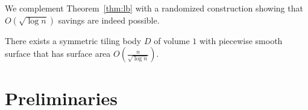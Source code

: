 We complement Theorem~\ref{thm:lb} with a randomized construction showing that $O(\sqrt{\log n})$ savings
are indeed possible.
\begin{thm}\label{thm:ub}
	There exists a symmetric tiling body $D$ of volume $1$
	with piecewise smooth surface that has surface area $O\left(\frac{n}{\sqrt{\log n}}\right)$.
\end{thm}






































































































\setcounter{thm}{8}\section{Preliminaries}\label{sec:prelim}

